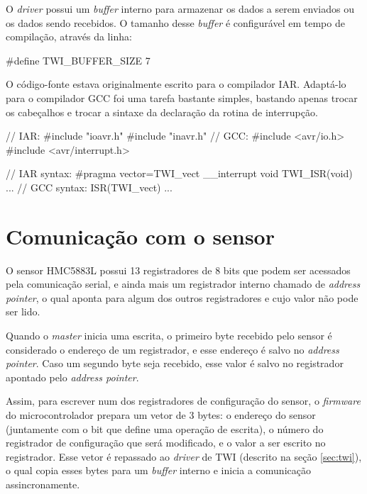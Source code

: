 \documentclass[brazil,pagestart=firstchapter]{abnt}
\begin{document}
O \textit{driver} possui um \textit{buffer} interno para armazenar os dados
a serem enviados ou os dados sendo recebidos. O tamanho desse
\textit{buffer} é configurável em tempo de compilação, através da linha:

\begin{ccode}[numbers=none]
#define TWI_BUFFER_SIZE     7
\end{ccode}

O código-fonte estava originalmente escrito para o compilador IAR. Adaptá-lo
para o compilador GCC foi uma tarefa bastante simples, bastando apenas
trocar os cabeçalhos e trocar a sintaxe da declaração da rotina de
interrupção. \cite{avrlibcporting}

\begin{ccode}[numbers=none, multicols=2, float=h]
// IAR:
#include "ioavr.h"
#include "inavr.h"
// GCC:
#include <avr/io.h>
#include <avr/interrupt.h>
\end{ccode}

\begin{ccode}[numbers=none, multicols=2, float=h]
// IAR syntax:
#pragma vector=TWI_vect
__interrupt void TWI_ISR(void)
{
  ...
}
// GCC syntax:
ISR(TWI_vect)
{
  ...
}

\end{ccode}


\section{Comunicação com o sensor}
\label{sec:software_sensor}

O sensor HMC5883L possui 13 registradores de 8 bits que podem ser acessados
pela comunicação serial, e ainda mais um registrador interno chamado de
\textit{address pointer}, o qual aponta para algum dos outros registradores
e cujo valor não pode ser lido. \cite[p.~11]{HMC5883L}

Quando o \textit{master} inicia uma escrita, o primeiro byte recebido pelo
sensor é considerado o endereço de um registrador, e esse endereço é salvo
no \textit{address pointer}. Caso um segundo byte seja recebido, esse valor
é salvo no registrador apontado pelo \textit{address pointer}.

Assim, para escrever num dos registradores de configuração do sensor, o
\textit{firmware} do microcontrolador prepara um vetor de 3 bytes: o
endereço do sensor (juntamente com o bit que define uma operação de
escrita), o número do registrador de configuração que será modificado, e o
valor a ser escrito no registrador. Esse vetor é repassado ao
\textit{driver} de \ac{TWI} (descrito na seção \ref{sec:twi}), o qual copia
esses bytes para um \textit{buffer} interno e inicia a comunicação
assincronamente.
\end{document}
